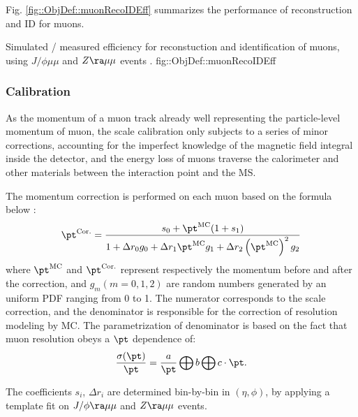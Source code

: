 Fig. \ref{fig::ObjDef::muonRecoIDEff} summarizes the performance of reconstruction and ID for muons.

{ Simulated / measured efficiency for reconstuction and identification of muons, using $J/\phi\mu\mu$ and $Z\ra\mu\mu$ events \cite{166_muonPerformance2015data}.}
{fig::ObjDef::muonRecoIDEff}





\subsubsection{Calibration} \label{sec::objDef::muons::calib}
As the momentum of a muon track already well representing the particle-level momentum of muon, 
the scale calibration only subjects to a series of minor corrections, accounting for the imperfect knowledge of the magnetic field integral inside the detector, and the energy loss of muons traverse the calorimeter and other materials between the interaction point and the MS.

The momentum correction is performed on each muon based on the formula below \cite{165_muonPerf2011_2012}:
\begin{align}
\pt^{\mathrm{Cor.}} = \frac{ s_0  + \pt^{\mathrm{MC}}  (1+s_1) } {1+ \Delta r_0  g_0  + \Delta r_1 
 \pt^{\mathrm{MC}} g_1  + \Delta r_2 \left( \pt^{\mathrm{MC}} \right)^2  g_2} 
\end{align}
where $\pt^{\mathrm{MC}}$ and $\pt^{\mathrm{Cor.}}$ represent respectively the momentum before and after the correction, and $g_m (m=0,1,2)$ are random numbers generated by an uniform PDF ranging from 0 to 1.
The numerator corresponds to the scale correction, and the denominator is responsible for the correction of resolution modeling by MC. The parametrization of denominator is based on the fact that muon resolution obeys a $\pt$ dependence of:
\begin{align}
\frac{\sigma(\pt)}{\pt} = \frac{a}{\pt} \bigoplus b \bigoplus c \cdot \pt.
\end{align}

The coefficients $s_i$, $\Delta r_i$ are determined bin-by-bin in $(\eta,\phi)$, 
by applying a template fit on $J/\phi\ra \mu\mu$ and $Z\ra \mu\mu$ events.

